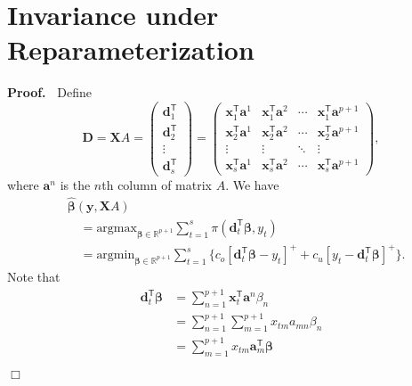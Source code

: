 \documentclass[a4paper,11pt]{article}
\newenvironment{proof}
 {\begin{trivlist} \item[] {\bf Proof.\ }}{\hfill$\Box$ \end{trivlist}}
\begin{document}
\section{Invariance under Reparameterization}
\label{app:B}
\begin{proof}
Define
    \[
        \mathbf{D}=\mathbf{X}A
        =\begin{pmatrix}
            \mathbf{d}_1^{\mathsf{T}}\\
            \mathbf{d}_2^{\mathsf{T}}\\
            \vdots\\
            \mathbf{d}_s^{\mathsf{T}}
        \end{pmatrix}
        =\begin{pmatrix}
            \mathbf{x}_{1}^{\mathsf{T}}\mathbf{a}^1&\mathbf{x}_1^{\mathsf{T}}\mathbf{a}^2&\cdots &\mathbf{x}_1^{\mathsf{T}}\mathbf{a}^{p+1}\\
            \mathbf{x}_2^{\mathsf{T}}\mathbf{a}^1&\mathbf{x}_2^{\mathsf{T}}\mathbf{a}^2&\cdots &\mathbf{x}_2^{\mathsf{T}}\mathbf{a}^{p+1}\\
            \vdots &\vdots &\ddots &\vdots \\
            \mathbf{x}_s^{\mathsf{T}}\mathbf{a}^1&\mathbf{x}_s^{\mathsf{T}}\mathbf{a}^2&\cdots &\mathbf{x}_s^{\mathsf{T}}\mathbf{a}^{p+1}
        \end{pmatrix},
    \]
    where $\mathbf{a}^n$ is the $n$th column of matrix $A$. We have
    \[
        \begin{aligned}
            &\hat{\boldsymbol{\beta}}(\mathbf{y},\mathbf{X}A)\\
            &\quad=\text{argmax}_{\boldsymbol{\beta}\in \mathbb{R}^{p+1}}\displaystyle\sum_{t=1}^s{\pi(\mathbf{d}_t^{\mathsf{T}}\boldsymbol{\beta},y_t)}\\
            &\quad=\text{argmin}_{\boldsymbol{\beta}\in \mathbb{R}^{p+1}}\displaystyle\sum_{t=1}^s{\{c_o[\mathbf{d}_t^{\mathsf{T}}\boldsymbol{\beta}-y_t]^{+}+c_u[y_t-\mathbf{d}_t^{\mathsf{T}}\boldsymbol{\beta}]^{+}\}}.
        \end{aligned}
    \]
    Note that
    \[
        \begin{aligned}
            \mathbf{d}_t^{\mathsf{T}}\boldsymbol{\beta}
            &=\displaystyle\sum_{n=1}^{p+1}\mathbf{x}_t^{\mathsf{T}}\mathbf{a}^n\beta_n\\
            &=\displaystyle\sum_{n=1}^{p+1}\displaystyle\sum_{m=1}^{p+1}x_{tm}a_{mn}\beta_n\\
            &=\displaystyle\sum_{m=1}^{p+1}x_{tm}\mathbf{a}_m^{\mathsf{T}}\boldsymbol{\beta}\\

\end{aligned}\]
\end{proof}
\end{document}
